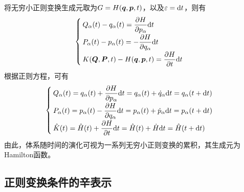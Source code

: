 将无穷小正则变换生成元取为$G = H(\boldsymbol{q},\boldsymbol{p},t)$，以及$\varepsilon = \mathrm{d} t$，则有
\begin{equation*}
	\begin{cases}
		\displaystyle Q_\alpha(t) - q_\alpha(t) = \frac{\partial H}{\partial p_\alpha} \mathrm{d} t \\[1.5ex]
		\displaystyle P_\alpha(t) - p_\alpha(t) = -\frac{\partial H}{\partial q_\alpha} \mathrm{d} t \\[1.5ex]
		\displaystyle K(\boldsymbol{Q},\boldsymbol{P},t) - H(\boldsymbol{q},\boldsymbol{p},t) = \frac{\partial H}{\partial t} \mathrm{d} t
	\end{cases}
\end{equation*}
根据正则方程，可有
\begin{equation*}
\begin{cases}
	\displaystyle Q_\alpha(t) = q_\alpha(t) + \frac{\partial H}{\partial p_\alpha} \mathrm{d} t = q_\alpha(t) + \dot{q}_\alpha \mathrm{d} t = q_\alpha(t+\mathrm{d} t) \\[1.5ex]
	\displaystyle P_\alpha(t) = p_\alpha(t) - \frac{\partial H}{\partial q_\alpha} \mathrm{d} t = p_\alpha(t) + \dot{p}_\alpha \mathrm{d} t = p_\alpha(t+\mathrm{d} t) \\[1.5ex]
	\displaystyle \hat{K}(t) = \hat{H}(t) + \frac{\partial H}{\partial t} \mathrm{d} t = \hat{H}(t) + \dot{H} \mathrm{d} t = \hat{H}(t+\mathrm{d}t)
\end{cases}
\end{equation*}
由此，体系随时间的演化可视为一系列无穷小正则变换的累积，其生成元为Hamilton函数。

\subsection{正则变换条件的辛表示}

